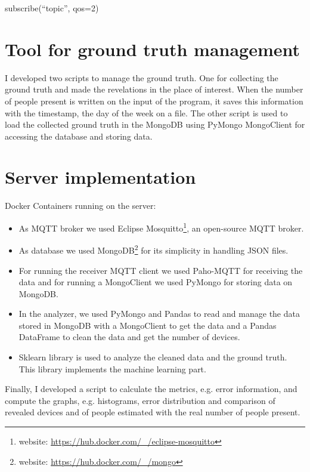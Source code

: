 subscribe(``topic'', qos=2)


\section{Tool for ground truth management}
\label{sec:toolgt}
\vspace{0.2 cm} 

I developed two scripts to manage the ground truth. One for collecting the ground truth and made the revelations in the place of interest. When the number of people present is written on the input of the program, it saves this information with the timestamp, the day of the week on a file.
The other script is used to load the collected ground truth in the MongoDB using PyMongo MongoClient for accessing the database and storing data.


\section{Server implementation}
\label{sec:server}
\vspace{0.2 cm} 

Docker Containers running on the server:
\begin{itemize}
  \item As MQTT broker we used Eclipse Mosquitto\footnote{ website: \url{https://hub.docker.com/_/eclipse-mosquitto} }, an open-source MQTT broker.
  \item As database we used MongoDB\footnote{ website: \url{https://hub.docker.com/_/mongo} } for its simplicity in handling JSON files.
  \item For running the receiver MQTT client we used Paho-MQTT for receiving the data and for running a MongoClient we used PyMongo for storing data on MongoDB.
  \item In the analyzer, we used PyMongo and Pandas to read and manage the data stored in MongoDB with a MongoClient to get the data and a Pandas DataFrame to clean the data and get the number of devices.
  \item Sklearn library is used to analyze the cleaned data and the ground truth. This library implements the machine learning part.
\end{itemize}

Finally, I developed a script to calculate the metrics, e.g. error information, and compute the graphs, e.g. histograms, error distribution and comparison of revealed devices and of people estimated with the real number of people present.
